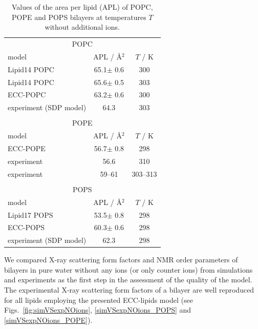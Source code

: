 \begin{table}[tb!] 
\centering
  \caption{Values of the area per lipid (APL) of POPC, POPE and POPS bilayers 
           at temperatures $T$ without additional ions. \label{tab:apls} } 
  \begin{tabular}{l|c c} 
    \multicolumn{3}{c}{POPC} \\
    model          & APL / Å$^2$   & $T$ / K  \\ 
    \hline 
    Lipid14 POPC                    & 65.1$\pm$ 0.6  &  300 \\ 
    Lipid14 POPC \citep{dickson14}  & 65.6$\pm$ 0.5  &  303 \\ 
    \hline 
    ECC-POPC     \citep{melcr18}    & 63.2$\pm$ 0.6  &  300       \\ 
    \hline 
    experiment (SDP model) \citep{kucerka11} & 64.3  &  303    \\ 
    \hline 
    \multicolumn{3}{c}{} \\
    \multicolumn{3}{c}{POPE} \\
    model          & APL / Å$^2$   & $T$ / K  \\ 
    \hline 
    ECC-POPE                 & 56.7$\pm$ 0.8  &  298 \\ 
    \hline 
    experiment   \citep{parsegian89} & 56.6  &  310    \\ 
    experiment   \citep{rappolt03}   & 59--61 &  303--313  \\ 
    \hline 
    \multicolumn{3}{c}{} \\
    \multicolumn{3}{c}{POPS} \\
    model          & APL / Å$^2$   & $T$ / K  \\ 
    \hline 
    Lipid17 POPS              & 53.5$\pm$ 0.8  &  298 \\ 
    \hline 
    ECC-POPS                & 60.3$\pm$ 0.6  &  298       \\ 
    \hline 
    experiment (SDP model) \cite{kucerka14} & 62.3  &  298    \\ 
    \hline 
  \end{tabular} 
\end{table} 
 
 
We compared X-ray scattering form factors and NMR order parameters of bilayers
in pure water without any ions (or only counter ions)
from simulations and experiments
as the first step in the assessment of the quality of the model. 
The experimental X-ray scattering form factors 
of a bilayer are well reproduced for all lipids employing the presented ECC-lipids model 
(see Figs.~\ref{fig:simVSexpNOions}, \ref{simVSexpNOions_POPS} and \ref{simVSexpNOions_POPE}). 

